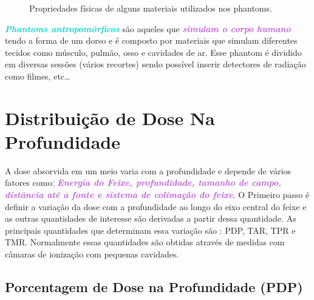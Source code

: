 \documentclass[11pt,a4paper]{article}
\begin{document}
		\begin{figure}[h]
			\centering
			\caption{Propriedades físicas de alguns materiais utilizados nos phantoms.}
			\label{fig:materiaisPhanton}
		\end{figure}


		\textcolor{DarkTurquoise}{\textbf{\textit{Phantoms antropomórficos}}} são aqueles que \textcolor{MediumOrchid}{\textbf{\textit{simulam o corpo humano}}} tendo a forma de um dorso e é composto por materiais que simulam diferentes tecidos como músculo, pulmão, osso e cavidades de ar. Esse phantom é dividido em diversas sessões (vários recortes) sendo possível inserir detectores de radiação como filmes, etc\dots


\section{Distribuição de Dose Na Profundidade}

	A dose absorvida em um meio varia com a profundidade e depende de vários fatores como: \textcolor{MediumOrchid}{\textbf{\textit{Energia do Feixe, profundidade, tamanho de campo, distância até a fonte e sistema de colimação do feixe}}}. O Primeiro passo é definir a variação da dose com a profundidade ao longo do eixo central do feixe e as outras quantidades de interesse são derivadas a partir dessa quantidade. As principais quantidades que determinam essa variação são : PDP, TAR, TPR e TMR. Normalmente essas quantidades são obtidas através de medidas com câmaras de ionização com pequenas cavidades. 

\subsection*{Porcentagem de Dose na Profundidade (PDP)}
\end{document}
